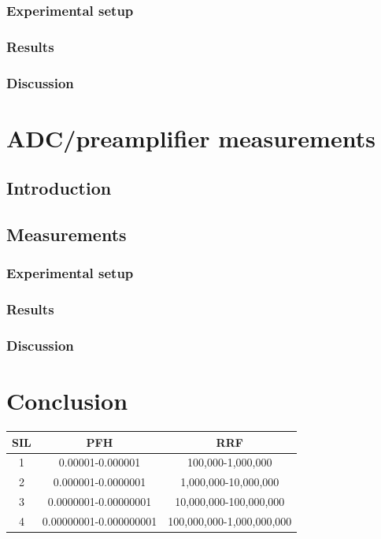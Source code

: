 \documentclass[11pt]{report}
\begin{document}
	\subsection{Experimental setup}
		\subsection{Results}
		\subsection{Discussion}


\chapter{ADC/preamplifier measurements}
\section{Introduction}
\section{Measurements}
	\subsection{Experimental setup}
		\subsection{Results}
		\subsection{Discussion}

\chapter{Conclusion}



\begin{center}
\begin{tabular}{|c||c|c|}
\hline 
SIL & 	PFH &		RRF\\ \hline
1 &	0.00001-0.000001 &	100,000-1,000,000\\
2 &	0.000001-0.0000001 &		1,000,000-10,000,000\\
3 &	0.0000001-0.00000001 		& 10,000,000-100,000,000\\
4 &	0.00000001-0.000000001 &	100,000,000-1,000,000,000\\
\hline
\end{tabular}
\end{center}
\end{document}
